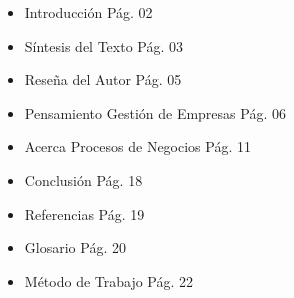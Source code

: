 \vspace{2cm}
\begin{itemize}
	\item Introducci\'on       		\hspace{10cm}    P\'ag. 02\\
	\item S\'intesis del Texto 		\hspace{9.15cm}  P\'ag. 03\\
	\item Rese\~na del Autor   		\hspace{9.19cm}  P\'ag. 05\\
	\item Pensamiento Gestión de Empresas   \hspace{6.35cm}     P\'ag. 06\\
	\item Acerca Procesos de Negocios	\hspace{7.25cm}     P\'ag. 11\\
	\item Conclusi\'on        		\hspace{10.25cm}  P\'ag. 18\\
	\item Referencias          		\hspace{10.25cm} P\'ag. 19\\
	\item Glosario             		\hspace{10.75cm} P\'ag. 20\\
	\item M\'etodo de Trabajo  		\hspace{8.9cm}   P\'ag. 22\\
\end{itemize}
\newpage
